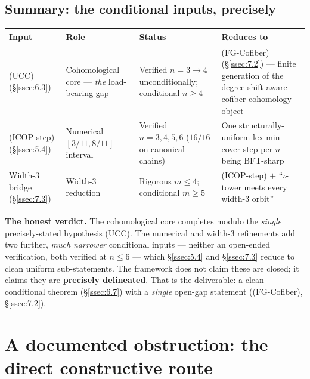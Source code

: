 \documentclass[11pt,reqno]{amsart}
\theoremstyle{plain}
\theoremstyle{definition}
\newcommand{\UCC}{\textup{(UCC)}}
\newcommand{\FGC}{\textup{(FG-Cofiber)}}
\newcommand{\ICOPstep}{\textup{(ICOP-step)}}
\begin{document}
\subsection{Summary: the conditional inputs, precisely}\label{ssec:7.4}
\begin{center}
\renewcommand{\arraystretch}{1.3}
\begin{tabular}{p{} p{} p{} p{}}
\toprule
Input & Role & Status & Reduces to \\
\midrule
\UCC{} \newline (\S\ref{ssec:6.3}) &
Cohomological core --- \emph{the} load-bearing gap &
Verified $n=3\to4$ unconditionally; conditional $n\ge4$ &
\FGC{} (\S\ref{ssec:7.2}) --- finite generation of the
degree-shift-aware cofiber-cohomology object \\
\ICOPstep{} \newline (\S\ref{ssec:5.4}) &
Numerical $[3/11,8/11]$ interval &
Verified $n=3,4,5,6$ ($16/16$ on canonical chains) &
One structurally-uniform lex-min cover step per $n$ being BFT-sharp \\
Width-3 bridge \newline (\S\ref{ssec:7.3}) &
Width-3 reduction &
Rigorous $m\le4$; conditional $m\ge5$ &
\ICOPstep{} $+$ ``$\iota$-tower meets every width-3 orbit'' \\
\bottomrule
\end{tabular}
\end{center}

\noindent\textbf{The honest verdict.} The cohomological core completes
modulo the \emph{single} precisely-stated hypothesis \UCC. The numerical
and width-3 refinements add two further, \emph{much narrower}
conditional inputs --- neither an open-ended verification, both verified
at $n\le6$ --- which \S\ref{ssec:5.4} and \S\ref{ssec:7.3} reduce to
clean uniform sub-statements. The framework does not claim these are
closed; it claims they are \textbf{precisely delineated}. That is the
deliverable: a clean conditional theorem (\S\ref{ssec:6.7}) with a
\emph{single} open-gap statement (\FGC, \S\ref{ssec:7.2}).

\section{A documented obstruction: the direct constructive route}\label{sec:obstruction}
\end{document}
